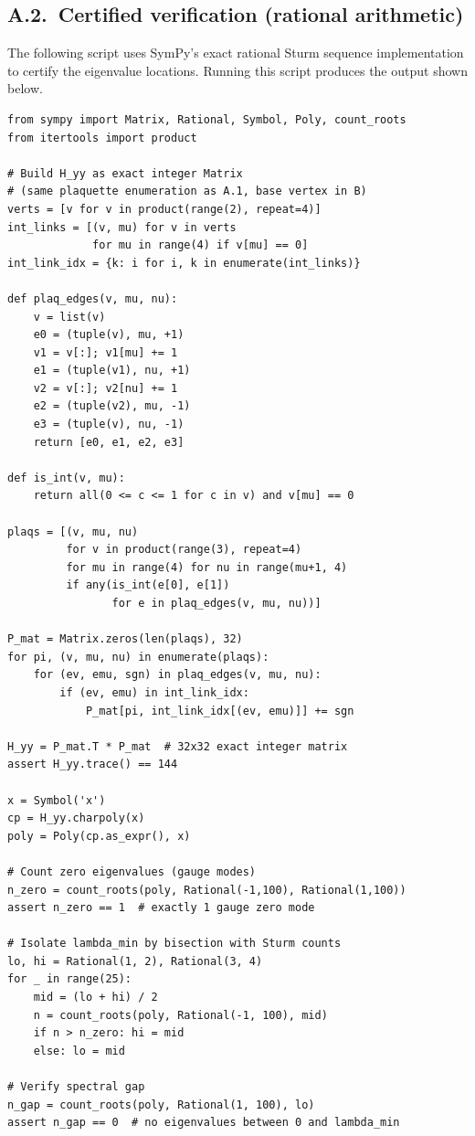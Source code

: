 \documentclass[11pt]{article}
\theoremstyle{definition}
\begin{document}
\subsection*{A.2.~Certified verification (rational arithmetic)}

The following script uses SymPy's exact rational Sturm sequence
implementation to certify the eigenvalue locations.  Running this
script produces the output shown below.

\begin{verbatim}
from sympy import Matrix, Rational, Symbol, Poly, count_roots
from itertools import product

# Build H_yy as exact integer Matrix
# (same plaquette enumeration as A.1, base vertex in B)
verts = [v for v in product(range(2), repeat=4)]
int_links = [(v, mu) for v in verts
             for mu in range(4) if v[mu] == 0]
int_link_idx = {k: i for i, k in enumerate(int_links)}

def plaq_edges(v, mu, nu):
    v = list(v)
    e0 = (tuple(v), mu, +1)
    v1 = v[:]; v1[mu] += 1
    e1 = (tuple(v1), nu, +1)
    v2 = v[:]; v2[nu] += 1
    e2 = (tuple(v2), mu, -1)
    e3 = (tuple(v), nu, -1)
    return [e0, e1, e2, e3]

def is_int(v, mu):
    return all(0 <= c <= 1 for c in v) and v[mu] == 0

plaqs = [(v, mu, nu)
         for v in product(range(3), repeat=4)
         for mu in range(4) for nu in range(mu+1, 4)
         if any(is_int(e[0], e[1])
                for e in plaq_edges(v, mu, nu))]

P_mat = Matrix.zeros(len(plaqs), 32)
for pi, (v, mu, nu) in enumerate(plaqs):
    for (ev, emu, sgn) in plaq_edges(v, mu, nu):
        if (ev, emu) in int_link_idx:
            P_mat[pi, int_link_idx[(ev, emu)]] += sgn

H_yy = P_mat.T * P_mat  # 32x32 exact integer matrix
assert H_yy.trace() == 144

x = Symbol('x')
cp = H_yy.charpoly(x)
poly = Poly(cp.as_expr(), x)

# Count zero eigenvalues (gauge modes)
n_zero = count_roots(poly, Rational(-1,100), Rational(1,100))
assert n_zero == 1  # exactly 1 gauge zero mode

# Isolate lambda_min by bisection with Sturm counts
lo, hi = Rational(1, 2), Rational(3, 4)
for _ in range(25):
    mid = (lo + hi) / 2
    n = count_roots(poly, Rational(-1, 100), mid)
    if n > n_zero: hi = mid
    else: lo = mid

# Verify spectral gap
n_gap = count_roots(poly, Rational(1, 100), lo)
assert n_gap == 0  # no eigenvalues between 0 and lambda_min
\end{verbatim}
\end{document}
